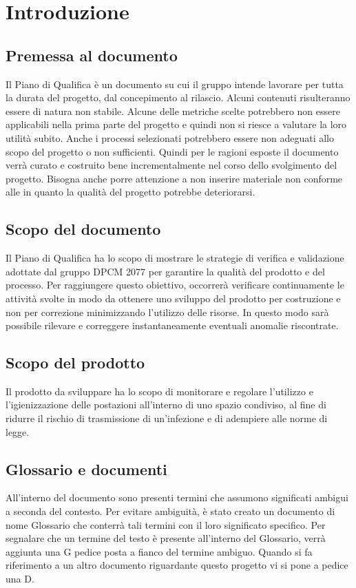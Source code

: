 \section{Introduzione}

\subsection{Premessa al documento}
Il Piano di Qualifica è un documento su cui il gruppo intende lavorare per tutta la durata del progetto, dal concepimento al rilascio.
Alcuni contenuti risulteranno essere di natura non stabile. Alcune delle metriche scelte potrebbero non essere applicabili nella prima parte del progetto e quindi non si riesce a valutare la loro utilità subito.
Anche i processi selezionati potrebbero essere non adeguati allo scopo del progetto o non sufficienti. Quindi per le ragioni esposte il documento verrà curato e costruito bene incrementalmente nel corso 
dello svolgimento del progetto. Bisogna anche porre attenzione a non inserire materiale non conforme alle  in quanto la qualità del progetto potrebbe deteriorarsi.

\subsection{Scopo del documento}
Il Piano di Qualifica ha lo scopo di mostrare le strategie di verifica e validazione adottate dal gruppo DPCM 2077 per garantire la qualità del prodotto e del processo. 
Per raggiungere questo obiettivo, occorrerà verificare continuamente le attività svolte in modo da ottenere uno sviluppo del prodotto per costruzione e non per correzione minimizzando l’utilizzo delle risorse.
In questo modo sarà possibile rilevare e correggere instantaneamente eventuali anomalie riscontrate.

\subsection{Scopo del prodotto}
Il prodotto da sviluppare ha lo scopo di monitorare e regolare l'utilizzo e l'igienizzazione delle postazioni all'interno di uno spazio condiviso, al fine di ridurre il rischio di trasmissione di un'infezione e di adempiere alle norme di legge. 
\subsection{Glossario e documenti} 
All'interno del  documento sono presenti termini che assumono significati ambigui a seconda del contesto.
Per evitare ambiguità, è stato creato un  documento di nome Glossario che  conterrà tali termini con il loro significato specifico. Per segnalare che un termine del testo è presente all'interno del Glossario, verrà aggiunta una G pedice posta a fianco del termine ambiguo.
Quando si fa riferimento a un altro documento riguardante questo progetto vi si pone a pedice una D.

